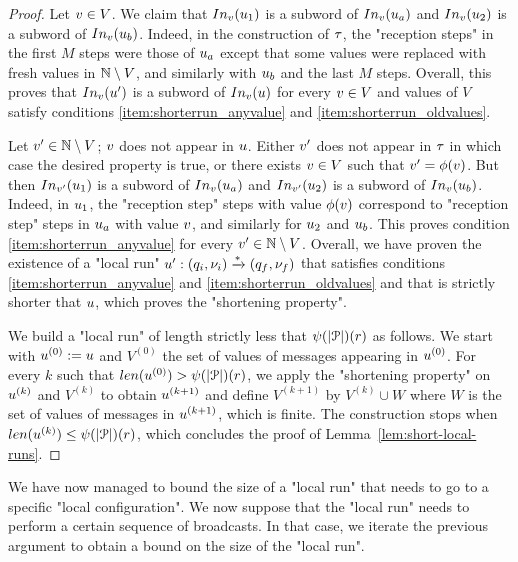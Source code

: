 \begin{proof}
	Let $v \in V$. We claim that $\vinput{\aval}{\localrun_{1}}$ is a subword of $\vinput{\aval}{\localrun_a}$ and $\vinput{\aval}{\localrun_{2}}$ is a subword of $\vinput{\aval}{\localrun_b}$. Indeed, in the construction of $\tau$, the "reception steps" in the first $M$ steps were those of $u_a$ except that some values were replaced with fresh values in $\mathbb{N} \setminus V$, and similarly with $u_b$ and the last $M$ steps. Overall, this proves that $\vinput{\aval}{\localrun'}$ is a subword of $\vinput{\aval}{\localrun}$ for every $v \in V$ and values of $V$ satisfy conditions \ref{item:shorterrun_anyvalue} and \ref{item:shorterrun_oldvalues}. 
	
	Let $v' \in \mathbb{N} \setminus V$; $v$ does not appear in $u$. Either $v'$ does not appear in $\tau$ in which case the desired property is true, or there exists $v \in V$ such that $v' = \phi(v)$. But then $\vinput{\aval'}{\localrun_{1}}$ is a subword of $\vinput{\aval}{\localrun_a}$ and $\vinput{\aval'}{\localrun_{2}}$ is a subword of $\vinput{\aval}{\localrun_b}$. Indeed, in $u_1$, the "reception step" steps with value $\phi(v)$ correspond to "reception step" steps in $u_a$ with value $v$, and similarly for $u_2$ and $u_b$. This proves condition \ref{item:shorterrun_anyvalue} for every $v' \in \mathbb{N} \setminus V$.
	Overall, we have proven the existence of a "local run" $u': (q_i,\nu_i) \xrightarrow{*} (q_f,\nu_f)$ that satisfies conditions \ref{item:shorterrun_anyvalue} and \ref{item:shorterrun_oldvalues} and that is strictly shorter that $u$, which proves the "shortening property".
	
	We build a "local run" of length strictly less that $\psi(|\mathcal{P}|)(r)$ as follows. We start with $u^{(0)} := u$ and $V^{(0)}$ the set of values of messages appearing in $u^{(0)}$. For every $k$ such that $\length{\localrun^{(0)}} > \towerfun(\size{\prot})(\regnum)$, we apply the "shortening property" on $u^{(k)}$ and $V^{(k)}$ to obtain $u^{(k+1)}$ and define $V^{(k+1)}$ by $V^{(k)} \cup W$ where $W$ is the set of values of messages in $u^{(k+1)}$, which is finite.
	The construction stops when $\length{\localrun^{(k)}} \leq \towerfun(\size{\prot})(\regnum)$, which concludes the proof of Lemma~\ref{lem:short-local-runs}. 
\end{proof}

We have now managed to bound the size of a "local run" that needs to go to a specific "local configuration". We now suppose that the "local run" needs to perform a certain sequence of broadcasts. In that case, we iterate the previous argument to obtain a bound on the size of the "local run".

